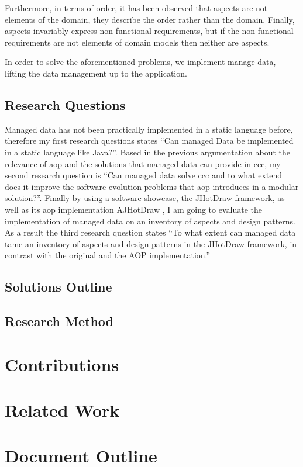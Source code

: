Furthermore, in terms of order, it has been observed that aspects are not elements of the domain, they describe the order rather than the domain. 
Finally, aspects invariably express non-functional requirements, but if the non-functional requirements are not elements of domain models then neither are aspects.

In order to solve the aforementioned problems, we implement manage data, lifting the data management up to the application.

\subsection{Research Questions}\label{Research Questions}
Managed data has not been practically implemented in a static language before, therefore my first research questions states 
``Can managed Data be implemented in a static language like Java?''. 
Based in the previous argumentation about the relevance of \ac{aop} and the solutions that managed data can provide in \ac{ccc}, my second research question is ``Can managed data solve \ac{ccc} and to what extend does it improve the software evolution problems that \ac{aop} introduces in a modular solution?''. 
Finally by using a software showcase, the JHotDraw framework, as well as its \ac{aop} implementation AJHotDraw \cite{marinajhotdraw}, 
I am going to evaluate the implementation of managed data on an inventory of aspects and design patterns. 
As a result the third research question states ``To what extent can managed data tame an inventory of aspects and design patterns in the JHotDraw framework, in contrast with the original and the AOP implementation.''

\subsection{Solutions Outline}\label{Solutions Outline}

\subsection{Research Method}\label{Research Method}

\section{Contributions}\label{Contributions}

\section{Related Work}\label{Related Work}

\section{Document Outline}\label{Document Outline}
